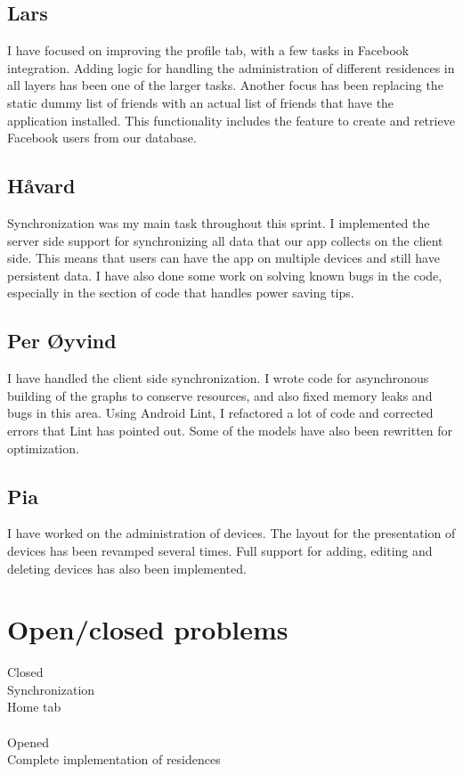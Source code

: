 \documentclass[12pt]{article}
\begin{document}
\subsection*{Lars}
I have focused on improving the profile tab, with a few tasks in Facebook integration. Adding logic for handling the administration of different residences in all layers has been one of the larger tasks. Another focus has been replacing the static dummy list of friends with an actual list of friends that have the application installed. This functionality includes the feature to create and retrieve Facebook users from our database.

\subsection*{Håvard}
Synchronization was my main task throughout this sprint. I implemented the server side support for synchronizing all data that our app collects on the client side. This means that users can have the app on multiple devices and still have persistent data. I have also done some work on solving known bugs in the code, especially in the section of code that handles power saving tips.


\subsection*{Per Øyvind}
I have handled the client side synchronization. I wrote code for asynchronous building of the graphs to conserve resources, and also fixed memory leaks and bugs in this area. Using Android Lint, I refactored a lot of code and corrected errors that Lint has pointed out. Some of the models have also been rewritten for optimization.

\subsection*{Pia}
I have worked on the administration of devices. The layout for the presentation of devices has been revamped several times. Full support for adding, editing and deleting devices has also been implemented.

\section{Open/closed problems}
Closed \\
Synchronization\\
Home tab\\\\
Opened \\
Complete implementation of residences
\end{document}
